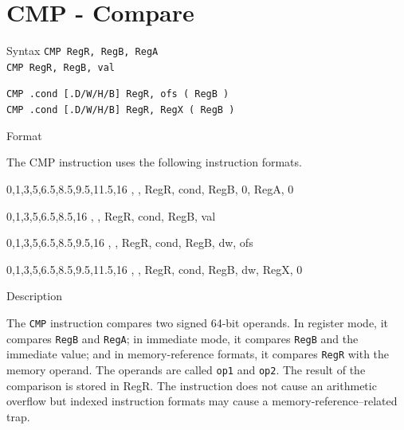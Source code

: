 %
%
\pagebreak
\section*{CMP - Compare}

\begin{iPageDescEntry}{Syntax} 
  \texttt{CMP RegR, RegB, RegA} \\
  \texttt{CMP RegR, RegB, val}
  
  \texttt{CMP .cond [.D/W/H/B] RegR, ofs ( RegB )} \\
  \texttt{CMP .cond [.D/W/H/B] RegR, RegX ( RegB )}
\end{iPageDescEntry}

\begin{iPageDescEntry}{Format}

The CMP instruction uses the following instruction formats. \\
	
\begin{flushleft}	

	\drawInstrFormat
  	{0,1,3,5,6.5,8.5,9.5,11.5,16}
  	{\OpCodeGrpALU, \OpCodeCMPA, RegR, cond, RegB, 0, RegA, 0}
	
	\drawInstrFormat
  	{0,1,3,5,6.5,8.5,16}
  	{\OpCodeGrpALU, \OpCodeCMPB, RegR, cond, RegB, val}

	\drawInstrFormat
  	{0,1,3,5,6.5,8.5,9.5,16}
  	{\OpCodeGrpMEM, \OpCodeCMPA, RegR, cond, RegB, dw, ofs}
 
	\drawInstrFormat
  	{0,1,3,5,6.5,8.5,9.5,11.5,16}
  	{\OpCodeGrpMEM, \OpCodeCMPB, RegR, cond, RegB, dw, RegX, 0}

\end{flushleft}  

\end{iPageDescEntry}

\begin{iPageDescEntry}{Description}

The \texttt{CMP} instruction compares two signed 64-bit operands. In register mode, it compares \texttt{RegB} and \texttt{RegA}; in immediate mode, it compares \texttt{RegB} and the immediate value; and in memory-reference formats, it compares \texttt{RegR} with the memory operand. The operands are called \texttt{op1} and \texttt{op2}. The result of the comparison is stored in RegR. The instruction does not cause an arithmetic overflow but indexed instruction formats may cause a memory-reference–related trap.
\end{iPageDescEntry}

